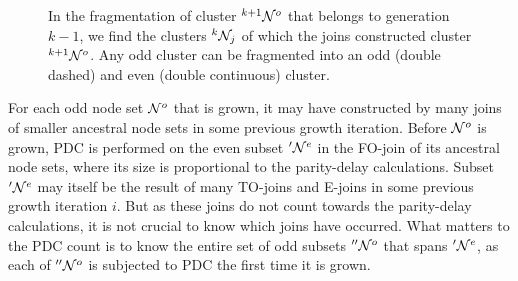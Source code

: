 \begin{figure}
  \caption{In the fragmentation of cluster ${}^{k+1}\mathcal{N}^o$ that belongs to generation $k-1$, we find the clusters ${}^{k}\mathcal{N}_j$ of which the joins constructed cluster ${}^{k+1}\mathcal{N}^o$. Any odd cluster can be fragmented into an odd (double dashed) and even (double continuous) cluster.}\label{fig:generation}
\end{figure}

For each odd node set $\mathcal{N}^o$ that is grown, it may have constructed by many joins of smaller ancestral node sets in some previous growth iteration. Before $\mathcal{N}^o$ is grown, PDC is performed on the even subset $'\mathcal{N}^e$ in the FO-join of its ancestral node sets, where its size is proportional to the parity-delay calculations. Subset $'\mathcal{N}^e$ may itself be the result of many TO-joins and E-joins in some previous growth iteration $i$. But as these joins do not count towards the parity-delay calculations, it is not crucial to know which joins have occurred. What matters to the PDC count is to know the entire set of odd subsets $''\mathcal{N}^o$ that spans $'\mathcal{N}^e$, as each of $''\mathcal{N}^o$ is subjected to PDC the first time it is grown.

